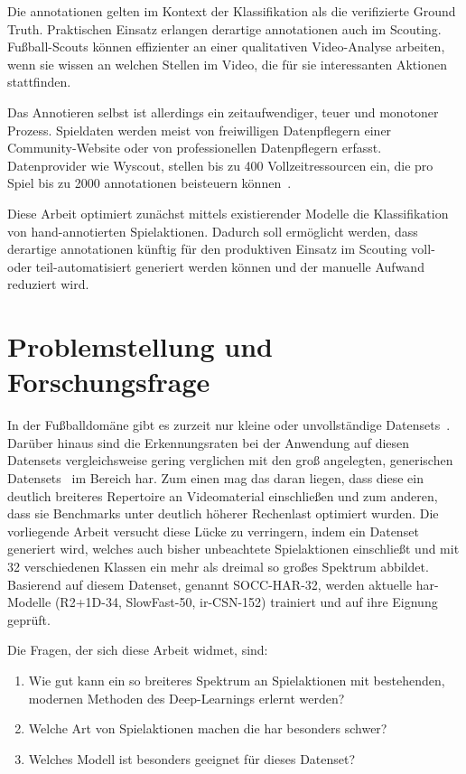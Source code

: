 Die \gls{annotationen} gelten im Kontext der Klassifikation als die \sog verifizierte Ground Truth.
Praktischen Einsatz erlangen derartige \gls{annotationen} auch im Scouting.
Fußball-Scouts können \zB effizienter an einer qualitativen Video-Analyse arbeiten, wenn sie wissen an welchen Stellen im Video, die für sie interessanten Aktionen stattfinden.

Das Annotieren selbst ist allerdings ein zeitaufwendiger, teuer und monotoner Prozess.
Spieldaten werden meist von freiwilligen Datenpflegern einer Community-Website oder von professionellen Datenpflegern erfasst.
Datenprovider wie Wyscout, stellen bis zu 400 Vollzeitressourcen ein, die pro Spiel bis zu 2000 \gls{annotationen} beisteuern können~\cite{Jiang19}.

Diese Arbeit optimiert zunächst mittels existierender Modelle die Klassifikation von hand-annotierten Spielaktionen.
Dadurch soll ermöglicht werden, dass derartige \gls{annotationen} künftig für den produktiven Einsatz im Scouting voll- oder teil-automatisiert generiert werden können und der manuelle Aufwand reduziert wird.

\section{Problemstellung und Forschungsfrage}
\label{sec:forschungsfrage}

In der Fußballdomäne gibt es zurzeit nur kleine oder unvollständige Datensets~\cite{Giancola18, Jiang19}.
Darüber hinaus sind die Erkennungsraten bei der Anwendung auf diesen Datensets vergleichsweise gering verglichen mit den groß angelegten, generischen Datensets~\cite{Kay17,Karpathy14} im Bereich \gls{har}.
Zum einen mag das daran liegen, dass diese ein deutlich breiteres Repertoire an Videomaterial einschließen und zum anderen, dass sie Benchmarks unter deutlich höherer Rechenlast optimiert wurden.
Die vorliegende Arbeit versucht diese Lücke zu verringern, indem ein Datenset generiert wird, welches auch bisher unbeachtete Spielaktionen einschließt und mit 32 verschiedenen Klassen ein mehr als dreimal so großes Spektrum abbildet.
Basierend auf diesem Datenset, genannt SOCC-HAR-32, werden aktuelle \gls{har}-Modelle (R2+1D-34, SlowFast-50, ir-CSN-152) trainiert und auf ihre Eignung geprüft.

Die Fragen, der sich diese Arbeit widmet, sind:
\begin{enumerate}
    \item Wie gut kann ein so breiteres Spektrum an Spielaktionen mit bestehenden, modernen Methoden des Deep-Learnings erlernt werden?
    \item Welche Art von Spielaktionen machen die \gls{har} besonders schwer?
    \item Welches Modell ist besonders geeignet für dieses Datenset?
\end{enumerate}


